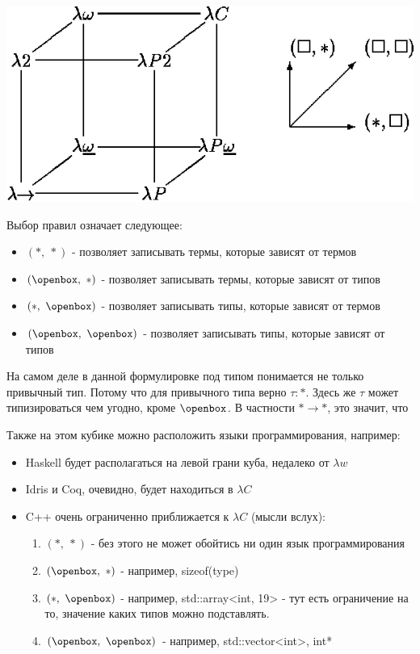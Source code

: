 \begin{center}
    {\includegraphics[scale=0.5]{pic.png}}
\end{center}

Выбор правил означает следующее:
\begin{itemize}
    \item $(*,\ *)$ - позволяет записывать термы, которые зависят от термов
    \item $(\openbox,\ *)$ - позволяет записывать термы, которые зависят от типов
    \item $(*,\ \openbox)$ - позволяет записывать типы, которые зависят от термов
    \item $(\openbox,\ \openbox)$ - позволяет записывать типы, которые зависят от типов
\end{itemize}

На самом деле в данной формулировке под типом понимается не только привычный тип. Потому что для привычного типа верно $\tau : *$. Здесь же $\tau$ может типизироваться чем угодно, кроме $\openbox$. В частности $* \rightarrow *$, это значит, что 
    
Также на этом кубике можно расположить языки программирования, например:
\begin{itemize}
    \item Haskell будет располагаться на левой грани куба, недалеко от $\lambda w$
    \item Idris и Coq, очевидно, будет находиться в $\lambda C$
    \item C++ очень ограниченно приближается к $\lambda C$ (мысли вслух):
    \begin{enumerate}
        \item $(*,\ *)$ - без этого не может обойтись ни один язык программирования
        \item $(\openbox,\ *)$ - например, sizeof(type)
        \item $(*,\ \openbox)$ - например, std::array<int, 19> - тут есть ограничение на то, значение каких типов можно подставлять.
        \item $(\openbox,\ \openbox)$ - например, std::vector<int>, int*
    \end{enumerate}
\end{itemize}

